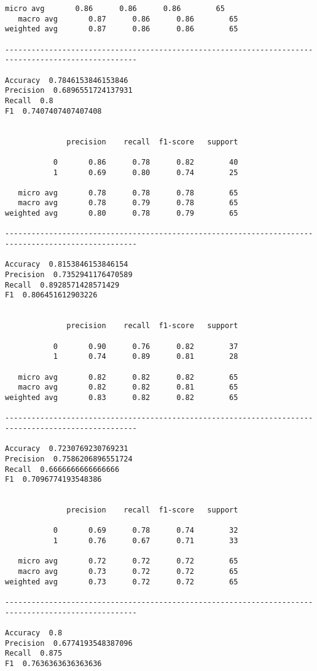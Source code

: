 \documentclass[11pt]{article}
\begin{document}
\begin{Verbatim}[commandchars=\\\{\}]
   micro avg       0.86      0.86      0.86        65
   macro avg       0.87      0.86      0.86        65
weighted avg       0.87      0.86      0.86        65

---------------------------------------------------------------------------------------------------- 

Accuracy  0.7846153846153846
Precision  0.6896551724137931
Recall  0.8
F1  0.7407407407407408


              precision    recall  f1-score   support

           0       0.86      0.78      0.82        40
           1       0.69      0.80      0.74        25

   micro avg       0.78      0.78      0.78        65
   macro avg       0.78      0.79      0.78        65
weighted avg       0.80      0.78      0.79        65

---------------------------------------------------------------------------------------------------- 

Accuracy  0.8153846153846154
Precision  0.7352941176470589
Recall  0.8928571428571429
F1  0.806451612903226


              precision    recall  f1-score   support

           0       0.90      0.76      0.82        37
           1       0.74      0.89      0.81        28

   micro avg       0.82      0.82      0.82        65
   macro avg       0.82      0.82      0.81        65
weighted avg       0.83      0.82      0.82        65

---------------------------------------------------------------------------------------------------- 

Accuracy  0.7230769230769231
Precision  0.7586206896551724
Recall  0.6666666666666666
F1  0.7096774193548386


              precision    recall  f1-score   support

           0       0.69      0.78      0.74        32
           1       0.76      0.67      0.71        33

   micro avg       0.72      0.72      0.72        65
   macro avg       0.73      0.72      0.72        65
weighted avg       0.73      0.72      0.72        65

---------------------------------------------------------------------------------------------------- 

Accuracy  0.8
Precision  0.6774193548387096
Recall  0.875
F1  0.7636363636363636



\end{Verbatim}
\end{document}
